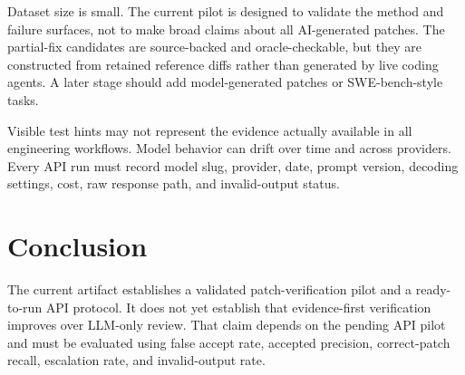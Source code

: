 \documentclass[conference]{IEEEtran}
\begin{document}
Dataset size is small. The current pilot is designed to validate the method and
failure surfaces, not to make broad claims about all AI-generated patches. The
partial-fix candidates are source-backed and oracle-checkable, but they are
constructed from retained reference diffs rather than generated by live coding
agents. A later stage should add model-generated patches or SWE-bench-style
tasks.

Visible test hints may not represent the evidence actually available in all
engineering workflows. Model behavior can drift over time and across providers.
Every API run must record model slug, provider, date, prompt version, decoding
settings, cost, raw response path, and invalid-output status.

\section{Conclusion}

The current artifact establishes a validated patch-verification pilot and a
ready-to-run API protocol. It does not yet establish that evidence-first
verification improves over LLM-only review. That claim depends on the pending
API pilot and must be evaluated using false accept rate, accepted precision,
correct-patch recall, escalation rate, and invalid-output rate.
\end{document}
